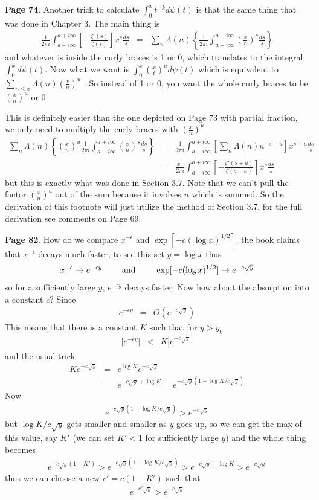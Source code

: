 \documentclass[aps,preprint,preprintnumbers,nofootinbib,showpacs,prd]{revtex4-1}
\newcommand{\nbea}{\begin{eqnarray*}}
\newcommand{\neea}{\end{eqnarray*}}
\begin{document}
{\bf Page 74}. Another trick to calculate $\int_0^x t^{-k} d\psi(t)$ is that the same thing that was done in Chapter 3. The main thing is
%
\nbea
\frac{1}{2\pi i} \int_{a-i\infty}^{a+i\infty} \left\lbrack -\frac{\zeta'(s)}{\zeta(s)} \right \rbrack x^s \frac{ds}{s} & = & \sum_n \Lambda(n) \left \{\frac{1}{2\pi i} \int_{a-i\infty}^{a+i\infty} \left (\frac{x}{n}\right)^s \frac{ds}{s} \right \}
\neea
%
and whatever is inside the curly braces is 1 or 0, which translates to the integral $\int_0^x d\psi(t)$. Now what we want is $\int_0^x \left(\frac{x}{t} \right)^{u} d\psi(t)$ which is equivalent to $\sum_{n \le x} \Lambda(n) \left(\frac{x}{n}\right)^u$ . So instead of 1 or 0, you want the whole curly braces to be $\left(\frac{x}{n}\right)^u$ or 0.

This is definitely easier than the one depicted on Page 73 with partial fraction, we only need to multiply the curly braces with $\left(\frac{x}{n}\right)^u$ 
%
\nbea
\sum_n \Lambda(n) \left \{ \left(\frac{x}{n}\right)^u \frac{1}{2\pi i} \int_{a-i\infty}^{a+i\infty} \left (\frac{x}{n}\right)^s \frac{ds}{s} \right \} & = & \frac{1}{2\pi i} \int_{a-i\infty}^{a+i\infty} \left\lbrack \sum_n \Lambda(n) n^{-s-u}\right \rbrack x^{s+u} \frac{ds}{s} \\
& = & \frac{x^u}{2\pi i} \int_{a-i\infty}^{a+i\infty} \left\lbrack -\frac{\zeta'(s+u)}{\zeta(s + u)} \right \rbrack x^{s} \frac{ds}{s}
\neea
%
but this is exactly what was done in Section 3.7. Note that we can't pull the factor $\left(\frac{x}{n}\right)^u$ out of the sum because it involves $n$ which is summed. So the derivation of this footnote will just utilize the method of Section 3.7, for the full derivation see comments on Page 69.

{\bf Page 82}. How do we compare $x^{-\epsilon}$ and $\exp[-c(\log x)^{1/2}]$, the book claims that $x^{-\epsilon}$ decays much faster, to see this set $y = \log x$ thus
%
\nbea
x^{-\epsilon} \to e^{-\epsilon y} ~~~~~~~{\rm and} ~~~~~~~ \exp[-c(\log x)^{1/2}] \to e^{-c\sqrt{y}}
\neea
%
so for a sufficiently large $y$, $e^{-\epsilon y}$ decays faster. Now how about the absorption into a constant $c$? Since
%
\nbea
e^{-\epsilon y} & = & O(e^{-c\sqrt{y}})
\neea
%
This means that there is a constant $K$ such that for $y > y_0$
%
\nbea
|e^{-\epsilon y}| & < & K|e^{-c\sqrt{y}}|
\neea
%
and the usual trick
%
\nbea
K e^{-c\sqrt{y}} & = & e^{\log K} e^{-c\sqrt{y}} \\
& = & e^{-c\sqrt{y} + \log K} = e^{-c\sqrt{y}(1 - \log K/c\sqrt{y})}
\neea
%
Now
%
\nbea
e^{-c\sqrt{y}(1 - \log K/c\sqrt{y})} > e^{-c\sqrt{y} }
\neea
%
but $\log K/c\sqrt{y}$ gets smaller and smaller as $y$ goes up, so we can get the max of this value, say $K'$ (we can set $K' < 1$ for sufficiently large $y$) and the whole thing becomes
%
\nbea
e^{-c\sqrt{y}(1 - K')} > e^{-c\sqrt{y}(1 - \log K/c\sqrt{y})} > e^{-c\sqrt{y} + \log K} > e^{-c\sqrt{y}}
\neea
%
thus we can choose a new $c' = c(1-K')$ such that
%
\nbea
e^{-c'\sqrt{y}} > e^{-c\sqrt{y}}
\neea
%
\end{document}

